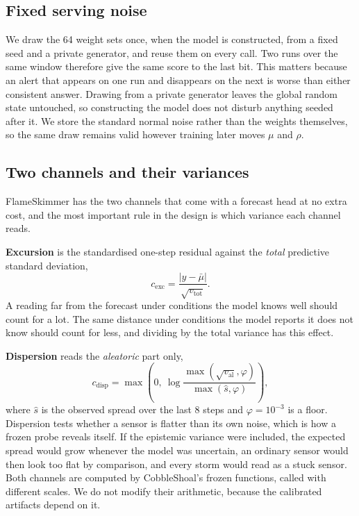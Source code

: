 \documentclass{article}
\begin{document}
\subsection{Fixed serving noise}
\label{sec:crn}

We draw the 64 weight sets once, when the model is constructed, from a fixed
seed and a private generator, and reuse them on every call. Two runs over the
same window therefore give the same score to the last bit. This matters
because an alert that appears on one run and disappears on the next is worse
than either consistent answer. Drawing from a private generator leaves the
global random state untouched, so constructing the model does not disturb
anything seeded after it. We store the standard normal noise rather than the
weights themselves, so the same draw remains valid however training later
moves $\mu$ and $\rho$.

\subsection{Two channels and their variances}
\label{sec:channels}

FlameSkimmer has the two channels that come with a forecast head at no extra
cost, and the most important rule in the design is which variance each channel
reads.

\textbf{Excursion} is the standardised one-step residual against the
\emph{total} predictive standard deviation,
\begin{equation}
  c_{\mathrm{exc}} = \frac{|y - \bar{\mu}|}{\sqrt{v_{\mathrm{tot}}}} .
\end{equation}
A reading far from the forecast under conditions the model knows well should
count for a lot. The same distance under conditions the model reports it does
not know should count for less, and dividing by the total variance has this
effect.

\textbf{Dispersion} reads the \emph{aleatoric} part only,
\begin{equation}
  c_{\mathrm{disp}} = \max\!\left(0,\ \log \frac{\max(\sqrt{v_{\mathrm{al}}}, \varphi)}{\max(\hat{s}, \varphi)}\right),
\end{equation}
where $\hat{s}$ is the observed spread over the last 8 steps and
$\varphi = 10^{-3}$ is a floor. Dispersion tests whether a sensor is flatter
than its own noise, which is how a frozen probe reveals itself. If the
epistemic variance were included, the expected spread would grow whenever the
model was uncertain, an ordinary sensor would then look too flat by comparison,
and every storm would read as a stuck sensor. Both channels are computed by
CobbleShoal's frozen functions, called with different scales. We do not modify
their arithmetic, because the calibrated artifacts depend on it.
\end{document}

